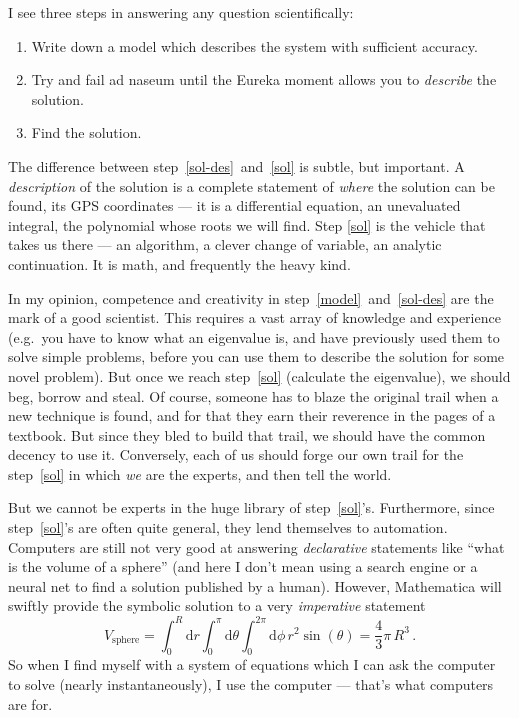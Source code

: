\documentclass[12pt, nofootinbib, notitlepage]{revtex4-1}
\newcommand{\diff}[1]{\text{d}#1}
\begin{document}
{\nobreak
	I see three steps in answering any question scientifically:

	\begin{enumerate}
		\item Write down a model which describes the system with sufficient accuracy.\label{model}
		
		\item Try and fail ad naseum until the Eureka moment
		allows you to \emph{describe} the solution.\label{sol-des}
		
		\item Find the solution.\label{sol}
	\end{enumerate}
	The difference between step~\ref{sol-des}~and~\ref{sol} is subtle, but important.
	A \emph{description} of the solution is a complete statement of 
	\emph{where} the solution can be found, its GPS coordinates ---
	it is a differential equation, 
	an unevaluated integral, the polynomial whose roots we will find.
	Step \ref{sol} is the vehicle that takes us there ---
	an algorithm, a clever change of variable, an analytic continuation. 
	It is math, and frequently the heavy kind.
	
	In my opinion, competence and creativity in step~\ref{model}~and~\ref{sol-des}
	are the mark of a good scientist. 
	This requires a vast array of knowledge and experience
	(e.g.\ you have to know what an eigenvalue is,
	and have previously used them to solve simple problems, 
	before you can use them to describe the solution for some novel problem).
	But once we reach step~\ref{sol} (calculate the eigenvalue),
	we should beg, borrow and steal. Of course, someone has to 
	blaze the original trail when a new technique is found, 
	and for that they earn their reverence in the pages of a textbook.
	But since they bled to build that trail, 
	we should have the common decency to use it.
	Conversely, each of us should forge our own trail for the
	step~\ref{sol} in which \emph{we} are the experts, and then tell the world.
	
	But we cannot be experts in the huge library of step~\ref{sol}'s.
	Furthermore, since step~\ref{sol}'s are often quite general, 
	they lend themselves to automation.
	Computers are still not very good at answering \emph{declarative} statements like
	``what is the volume of a sphere'' (and here I don't mean using a 
	search engine or a neural net to find a solution published by a human).
	However, Mathematica will swiftly provide the 
	symbolic solution to a very \emph{imperative} statement
	\begin{equation*}
		V_\text{sphere} = \int_0^R\diff{r}\int_0^\pi\diff{\theta}\int_0^{2\pi}\diff{\phi}
		 \,r^2\sin(\theta) = \frac{4}{3}\pi\,R^3\,.
	\end{equation*}
	So when I find myself with a system of equations which I can 
	ask the computer to solve (nearly instantaneously),
	I use the computer --- that's what computers are for.
}
\end{document}

